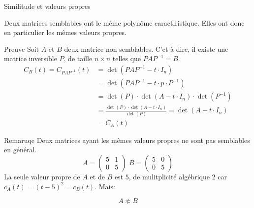\begin{parag}{Similitude et valeurs propres}
    \begin{theoreme}
        Deux matrices semblables ont le même polynôme caractlristique. Elles ont donc en particulier les mêmes valeurs propres.
    \end{theoreme}
    \begin{subparag}{Preuve}
        Soit $A$ et $B$ deux matrice non semblables. C'et à dire, il existe une matrice inversible $P$, de taille $n \times n$ telles que $PAP^{-1} = B$.\\
        \begin{align*}
            C_B(t) = C_{PAP^{-1}}(t) &= \det (PAP^{-1} - t\cdot I_n)\\
            &= \det (PAP^{-1} - t\cdot p\cdot P^{-1})\\
            &= \det(P) \cdot \det(A - t\cdot I_n) \cdot \det(P^{-1})\\
            &= \frac{\det(P) \cdot \det(A-t\cdot I_n)}{\det(P)} = \det(A - t\cdot I_n)\\
            &= C_A(t)
        \end{align*}
    \end{subparag}

    \begin{subparag}{Remaruqe}
        Deux matrices ayant les mêmes valeurs propres ne sont pas semblables en général.
        \[A = \begin{pmatrix}
            5 & 1 \\ 0 & 5
        \end{pmatrix} \; B = \begin{pmatrix}
            5 & 0 \\ 0 & 5
        \end{pmatrix}\]
        La seule valeur propre de $A$ et de $B$ est $5$, de mulitplicité algébrique $2$ car $c_A(t) = (t-5)^2 = c_B(t)$. Mais:
        \begin{formule}
            \[ A \not\approx B\]
        \end{formule}
    \end{subparag}
\end{parag}




